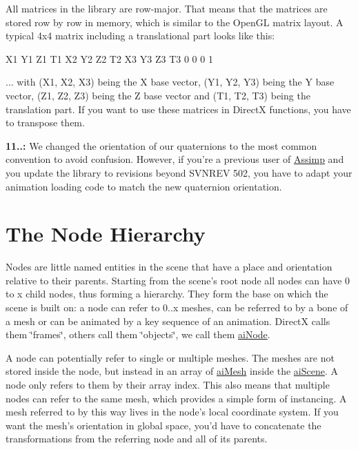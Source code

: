 All matrices in the library are row-\/major. That means that the matrices are stored row by row in memory, which is similar to the Open\+G\+L matrix layout. A typical 4x4 matrix including a translational part looks like this\+: 
\begin{DoxyCode}
X1  Y1  Z1  T1
X2  Y2  Z2  T2
X3  Y3  Z3  T3
0   0   0   1
\end{DoxyCode}


... with (X1, X2, X3) being the X base vector, (Y1, Y2, Y3) being the Y base vector, (Z1, Z2, Z3) being the Z base vector and (T1, T2, T3) being the translation part. If you want to use these matrices in Direct\+X functions, you have to transpose them.





{\bfseries 11..\+:} We changed the orientation of our quaternions to the most common convention to avoid confusion. However, if you're a previous user of \hyperlink{class_assimp}{Assimp} and you update the library to revisions beyond S\+V\+N\+R\+E\+V 502, you have to adapt your animation loading code to match the new quaternion orientation.



\hypertarget{data_hierarchy}{}\section{The Node Hierarchy}\label{data_hierarchy}
Nodes are little named entities in the scene that have a place and orientation relative to their parents. Starting from the scene's root node all nodes can have 0 to x child nodes, thus forming a hierarchy. They form the base on which the scene is built on\+: a node can refer to 0..x meshes, can be referred to by a bone of a mesh or can be animated by a key sequence of an animation. Direct\+X calls them \char`\"{}frames\char`\"{}, others call them \char`\"{}objects\char`\"{}, we call them \hyperlink{structai_node}{ai\+Node}.

A node can potentially refer to single or multiple meshes. The meshes are not stored inside the node, but instead in an array of \hyperlink{structai_mesh}{ai\+Mesh} inside the \hyperlink{structai_scene}{ai\+Scene}. A node only refers to them by their array index. This also means that multiple nodes can refer to the same mesh, which provides a simple form of instancing. A mesh referred to by this way lives in the node's local coordinate system. If you want the mesh's orientation in global space, you'd have to concatenate the transformations from the referring node and all of its parents.

